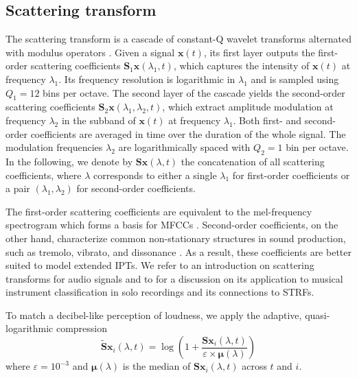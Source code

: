 \subsection{Scattering transform} %
The scattering transform is a cascade of constant-Q wavelet transforms alternated with modulus operators \cite{mallat2012cpam,anden2014taslp}.
Given a signal $\boldsymbol{x} (t)$, its first layer outputs the first-order scattering coefficients $\mathbf{S}_1 \boldsymbol{x} (\lambda_1, t)$, which captures the intensity of $\boldsymbol{x} (t)$ at frequency $\lambda_1$.
Its frequency resolution is logarithmic in $\lambda_1$ and is sampled using $Q_1 = 12$ bins per octave.
The second layer of the cascade yields the second-order scattering coefficients $\mathbf{S}_2 \boldsymbol{x} (\lambda_1, \lambda_2, t)$, which extract amplitude modulation at frequency $\lambda_2$ in the subband of $\boldsymbol{x} (t)$ at frequency $\lambda_1$.
Both first- and second-order coefficients are averaged in time over the duration of the whole signal.
The modulation frequencies $\lambda_2$ are logarithmically spaced with $Q_2 = 1$ bin per octave.
In the following, we denote by $\mathbf{S}\boldsymbol{x}(\lambda, t)$ the concatenation of all scattering coefficients, where $\lambda$ corresponds to either a single $\lambda_1$ for first-order coefficients or a pair $(\lambda_1,\lambda_2)$ for second-order coefficients.

The first-order scattering coefficients are equivalent to the mel-frequency spectrogram which forms a basis for MFCCs \cite{anden2014taslp}.
Second-order coefficients, on the other hand, characterize common non-stationary structures in sound production, such as tremolo, vibrato, and dissonance \cite[section 4]{anden2012dafx}.
As a result, these coefficients are better suited to model extended IPTs.
We refer to \cite{anden2014taslp} an introduction on scattering transforms for audio signals and to \cite[sections 3.2 and 4.5]{lostanlen2017phd} for a discussion on its application to musical instrument classification in solo recordings and its connections to STRFs.

To match a decibel-like perception of loudness, we apply the adaptive, quasi-logarithmic compression
\begin{equation}
\widetilde{\mathbf{S}} \boldsymbol{x}_i(\lambda, t) =
\log \left(
1 + \dfrac{\mathbf{S}\boldsymbol{x}_i(\lambda, t)}{\varepsilon \times \boldsymbol{\mu}(\lambda)}
\right)
\label{eq:log-scattering}
\end{equation}
where $\varepsilon = 10^{-3}$ and $\boldsymbol{\mu}(\lambda)$ is the median of $\mathbf{S}\boldsymbol{x}_i (\lambda, t)$ across $t$ and $i$.

